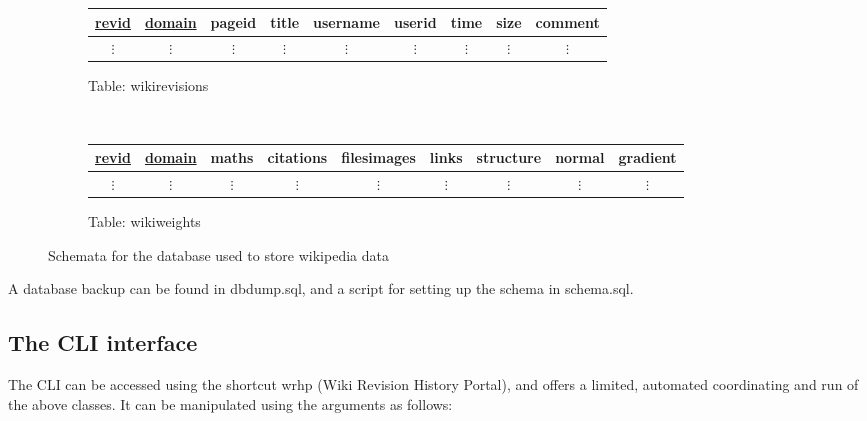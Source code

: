 \begin{figure}
\begin{subfigure}[b!]{\linewidth}
    \begin{tabular}{ccccccccc}
      \toprule
      \underline{revid} & \underline{domain} & pageid & title & username & userid & time & size &
      comment \\ 
      \midrule
      $\vdots$ & $\vdots$ & $\vdots$ & $\vdots$ & $\vdots$ & $\vdots$ & $\vdots$
      & $\vdots$ & $\vdots$ \\
    \end{tabular}
    \caption{Table: wikirevisions}
  \end{subfigure}\\
  \vspace{30 mm}
  \begin{subfigure}[b!]{\linewidth}
    \centering
    \begin{tabular}{ccccccccc}
      \toprule
      \underline{revid} & \underline{domain} & maths & citations & filesimages & links &
      structure & normal & gradient\\
      \midrule
      $\vdots$ & $\vdots$ & $\vdots$ & $\vdots$ & $\vdots$ & $\vdots$ &
      $\vdots$ & $\vdots$ & $\vdots$ \\
    \end{tabular}
    \caption{Table: wikiweights} 
  \end{subfigure}
  \caption{Schemata for the database used to store wikipedia data}
  \label{database-schema}
\end{figure}

A database backup can be found in dbdump.sql, and a script for setting
up the schema in schema.sql.

\subsection*{The CLI interface}
The CLI can be accessed using the shortcut wrhp (Wiki Revision History
Portal), and offers a limited, automated coordinating and run of
the above classes. It can be manipulated using the arguments as follows:


